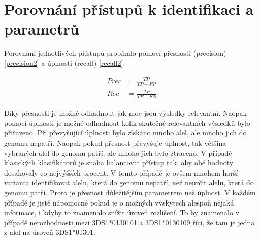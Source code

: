 \documentclass[czech,DP]{thesiskiv}
\numberwithin{equation}{section}
\begin{document}
\chapter{Porovnání přístupů k identifikaci a parametrů}
Porovnání jednotlivých přístupů probíhalo pomocí přesnosti (precision) \ref{precision2} a úplnosti (recall) \ref{recall2}. 

\begin{center}
	\begin{align}
   		\label{precision2} Prec &= \frac{TP}{TP + FP} \\[30pt]
   		\label{recall2} Rec &= \frac{TP}{TP + FN}
	\end{align}
\end{center}

\noindent
Díky přesnosti je možné odhadnout jak moc jsou výsledky relevantní. Naopak pomocí úplnosti je možné odhadnout kolik skutečně relevantních výsledků bylo přiřazeno. Při převyšující úplnosti bylo získáno mnoho alel, ale mnoho jich do genomu nepatří. Naopak pokud přesnost převyšuje úplnost, tak většina vybraných alel do genomu patří, ale mnoho jich bylo ztraceno. V případě klasických klasifikátorů je snaha balancovat přístup tak, aby obě hodnoty dosahovaly co nejvýšších procent. V tomto případě je ovšem mnohem horší varianta identifikovat alelu, která do genomu nepatří, než neurčit alelu, která do genomu patří. Proto je přesnost důležitějším parametrem než úplnost. V každém případě je jistě nápomocné pokud je o možných výskytech alespoň nějaká informace, i kdyby to znamenalo snížit úroveň rozlišení. To by znamenalo v případě nerozhodnosti mezi 3DS1*0130101 a 3DS1*0130109 říci, že tam je jedna z alel na úroveň 3DS1*01301. 
\end{document}

